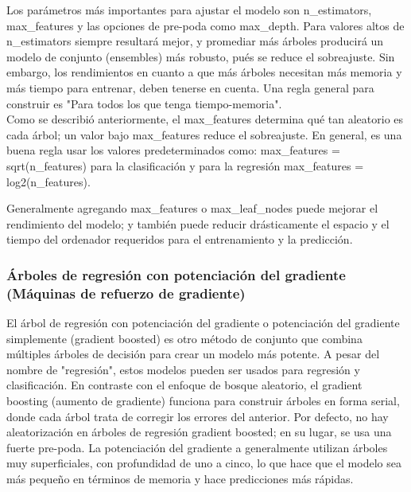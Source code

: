 {Los parámetros más importantes para ajustar el modelo son  {\ttfamily n\_estimators,  max\_features} y  las opciones de pre-poda como {\ttfamily max\_depth}. Para valores altos de {\ttfamily n\_estimators}  siempre resultará mejor, y promediar más árboles producirá un modelo de conjunto (ensembles) más robusto,  pués se  reduce el sobreajuste. Sin embargo, los  rendimientos en cuanto a que más árboles necesitan más memoria y más tiempo para entrenar, deben tenerse en cuenta. Una regla general para  construir es  "{}Para todos los que tenga tiempo-memoria{}".\\


Como se describió anteriormente, el {\ttfamily max\_features}  determina qué tan aleatorio es cada árbol;  un valor   bajo   {\ttfamily max\_features} reduce  el sobreajuste. En general, es una buena regla usar los valores predeterminados como:  {\ttfamily max\_features = sqrt(n\_features)} para la clasificación y  para la regresión   {\ttfamily max\_features = log2(n\_features)}.  

Generalmente agregando   {\ttfamily max\_features  o  max\_leaf\_nodes}  puede mejorar el rendimiento del modelo; y también puede reducir drásticamente el espacio y el tiempo del ordenador requeridos para el entrenamiento y la predicción.\\




\subsubsection{Árboles de regresión con potenciación del gradiente \\ (Máquinas de refuerzo de gradiente)} 




El árbol de regresión  con potenciación del gradiente o potenciación del gradiente simplemente (gradient boosted) es otro método de conjunto que  combina múltiples árboles de decisión para crear un modelo más potente. A pesar del  nombre de  "{}regresión", estos modelos  pueden  ser usados  para  regresión y clasificación.  En contraste  con el enfoque  de bosque aleatorio, el  gradient boosting (aumento de gradiente) funciona   para construir árboles en forma serial, donde cada árbol trata de corregir los errores del    anterior. Por defecto, no hay aleatorización en árboles de regresión gradient boosted; en su lugar, se usa una fuerte pre-poda. La  potenciación del gradiente   a generalmente utilizan árboles muy superficiales, con   profundidad de uno a cinco, lo que hace que el modelo sea más pequeño en términos  de memoria  y hace predicciones más rápidas.\\
 

}
